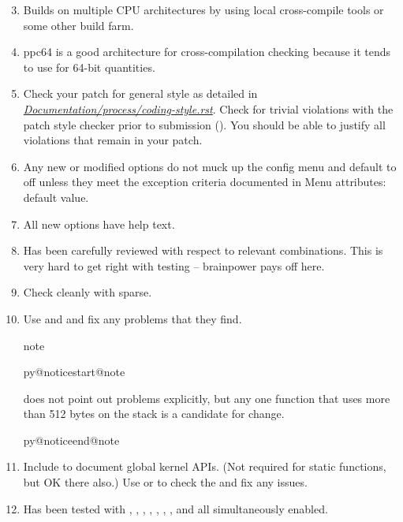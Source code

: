 \documentclass[a4paper,8pt,english]{sphinxmanual}
\makeatletter
\renewenvironment{notice}[2]{%
          \def\py@noticetype{#1}
          \begin{coloredbox}{#1}
          \bf\it
          \par\strong{#2}
          \csname py@noticestart@#1\endcsname
        }
	{
          \csname py@noticeend@\py@noticetype\endcsname
          \end{coloredbox}
        }
\makeatother
\begin{document}
\begin{enumerate}
\setcounter{enumi}{2}
\item {} 
Builds on multiple CPU architectures by using local cross-compile tools
or some other build farm.

\item {} 
ppc64 is a good architecture for cross-compilation checking because it
tends to use  for 64-bit quantities.

\item {} 
Check your patch for general style as detailed in
{\hyperref[process/coding\string-style:codingstyle]{\emph{Documentation/process/coding-style.rst}}}.
Check for trivial violations with the patch style checker prior to
submission ().
You should be able to justify all violations that remain in
your patch.

\item {} 
Any new or modified  options do not muck up the config menu and
default to off unless they meet the exception criteria documented in
 Menu attributes: default value.

\item {} 
All new  options have help text.

\item {} 
Has been carefully reviewed with respect to relevant 
combinations.  This is very hard to get right with testing -- brainpower
pays off here.

\item {} 
Check cleanly with sparse.

\item {} 
Use  and  and fix any problems
that they find.

\begin{notice}{note}{Note:}
 does not point out problems explicitly,
but any one function that uses more than 512 bytes on the stack is a
candidate for change.
\end{notice}

\item {} 
Include  to document global  kernel APIs.
(Not required for static functions, but OK there also.) Use
 or  to check the
 and fix any issues.

\item {} 
Has been tested with , ,
, , ,
, ,
 and  all
simultaneously enabled.


\end{enumerate}
\end{document}
